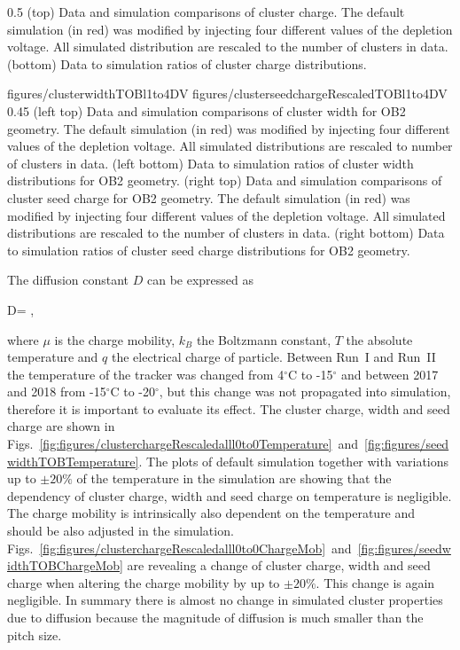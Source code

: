                  {0.5}       %
                 { (top) Data and simulation comparisons of cluster charge. The default simulation (in red) was modified by injecting four different values of the depletion voltage. All simulated distribution are rescaled to the number of clusters in data. (bottom) Data to simulation ratios of cluster charge distributions. }

                 {figures/clusterwidthTOBl1to4DV}
                 {figures/clusterseedchargeRescaledTOBl1to4DV} %
                 {0.45}       %
                 {(left top) Data and simulation  comparisons of cluster width for OB2 geometry. The default simulation (in red) was modified by injecting four different values of the depletion voltage. All simulated distributions are rescaled to number of clusters in data. (left bottom) Data to simulation ratios of cluster width distributions for OB2 geometry. (right top) Data and simulation  comparisons of cluster seed charge for OB2 geometry. The default simulation (in red) was modified by injecting four different values of the depletion voltage. All simulated distributions are rescaled to the number of clusters in data. (right bottom) Data to simulation ratios of cluster seed charge distributions for OB2 geometry. }

The diffusion constant $D$ can be expressed as

{
   D=  ,
}

where $\mu$ is the charge mobility, $k_{B}$ the Boltzmann constant, $T$ the absolute temperature and $q$ the electrical charge of particle. Between Run~I and Run~II the temperature of the tracker was changed from 4$^{\circ}$C to -15$^{\circ}$ and between 2017 and 2018 from -15$^{\circ}$C to -20$^{\circ}$, but this change was not propagated into simulation, therefore it is important to evaluate its effect. The cluster charge, width and seed charge are shown in Figs.~\ref{fig:figures/clusterchargeRescaledalll0to0Temperature}~and~\ref{fig:figures/seedwidthTOBTemperature}. The plots of default simulation together with variations up to $\pm 20\%$ of the temperature in the simulation are showing that the dependency of cluster charge, width and seed charge on temperature is negligible. The charge mobility is intrinsically also dependent on the temperature and should be also adjusted in the simulation. Figs.~\ref{fig:figures/clusterchargeRescaledalll0to0ChargeMob}~and~\ref{fig:figures/seedwidthTOBChargeMob} are revealing a change of cluster charge, width and seed charge when altering the charge mobility by up to $\pm 20\%$. This change is again negligible. In summary there is almost no change in simulated cluster properties due to diffusion because the magnitude of diffusion is much smaller than the pitch size.


